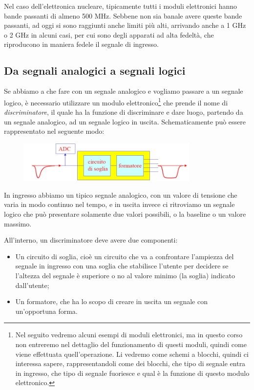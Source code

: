 Nel caso dell'elettronica nucleare, tipicamente tutti i moduli elettronici hanno bande passanti di almeno 500 MHz. Sebbene non sia banale avere queste bande passanti, ad oggi si sono raggiunti anche limiti più alti, arrivando anche a 1 GHz o 2 GHz in alcuni casi, per cui sono degli apparati ad alta fedeltà, che riproducono in maniera fedele il segnale di ingresso.

\subsection{Da segnali analogici a segnali logici}
Se abbiamo a che fare con un segnale analogico e vogliamo passare a un segnale logico, è necessario utilizzare un modulo elettronico\footnote{Nel seguito vedremo alcuni esempi di moduli elettronici, ma in questo corso non entreremo nel dettaglio del funzionamento di questi moduli, quindi come viene effettuata quell'operazione. Li vedremo come schemi a blocchi, quindi ci interessa sapere, rappresentandoli come dei blocchi, che tipo di segnale entra in ingresso, che tipo di segnale fuoriesce e qual è la funzione di questo modulo elettronico.} che prende il nome di \textit{discriminatore}, il quale ha la funzione di discriminare e dare luogo, partendo da un segnale analogico, ad un segnale logico in uscita. Schematicamente può essere rappresentato nel seguente modo:
\begin{figure}[H]
   \centering
   \includegraphics[width=0.8\textwidth]{immagini/discriminatore.png}
\end{figure}
In ingresso abbiamo un tipico segnale analogico, con un valore di tensione che varia in modo continuo nel tempo, e in uscita invece ci ritroviamo un segnale logico che può presentare solamente due valori possibili, o la baseline o un valore massimo.

All'interno, un discriminatore deve avere due componenti:
\begin{itemize}[leftmargin=0.5cm]
   \item Un circuito di soglia, cioè un circuito che va a confrontare l'ampiezza del segnale in ingresso con una soglia che stabilisce l'utente per decidere se l'altezza del segnale è superiore o no al valore minimo (la soglia) indicato dall'utente;
   \item Un formatore, che ha lo scopo di creare in uscita un segnale con un'opportuna forma.
\end{itemize}

